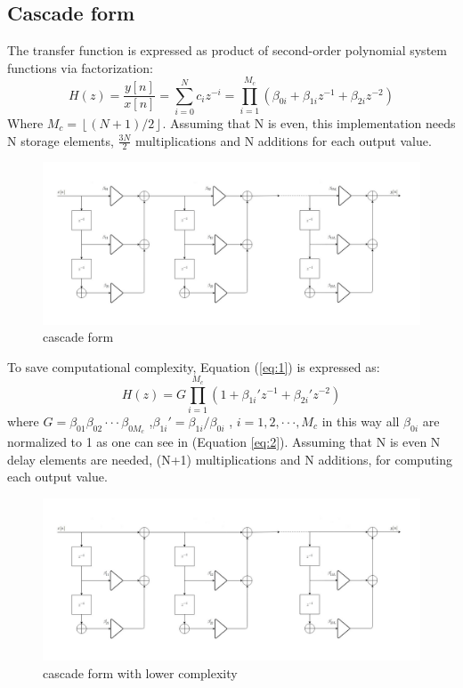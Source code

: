 \subsection{Cascade form}
The transfer function is expressed as product of second-order polynomial system functions via factorization:
\begin{equation} \label{eq:1}
H(z)=\frac{y[n]}{x[n]} =\sum_{i=0}^{N}c_{i}z^{-i}= \prod_{i=1}^{M_{c}}(\beta_{0i}+\beta_{1i}z^{-1}+\beta_{2i}z^{-2})
\end{equation}
Where $M_{c}= \left \lfloor (N+1)/2 \right \rfloor$.
Assuming that N is even, this implementation needs N storage elements, $\frac{3N}{2}$ multiplications and N additions for each output value.
\begin{figure}[H]
    \centering
    \includegraphics[scale=0.35]{images/cascade.jpg}    
    \caption{cascade form}
    \label{fig:cascade}
\end{figure}
To save computational complexity, Equation (\ref{eq:1}) is expressed as:
\begin{equation} \label{eq:2}
H(z)= G\prod_{i=1}^{M_{c}}(1+\beta_{1i}'z^{-1}+\beta_{2i}'z^{-2})
\end{equation}
where $G=\beta_{01}\beta_{02} \cdot\cdot\cdot\beta_{0M_{c}}$ ,$\beta_{1i}'=\beta_{1i}/\beta_{0i}$ , $i= 1,2,\cdot \cdot \cdot,M_{c}$ in this way all $\beta_{0i}$ are normalized to 1 as one can see in (Equation \ref{eq:2}). Assuming that N is even N delay elements are needed, (N+1) multiplications and N additions, for computing each output value.
\begin{figure}[H]
    \centering
    \includegraphics[scale=0.35]{images/cascadeoptimised.jpg}    
    \caption{cascade form with lower complexity}
    \label{fig:cascade_opt}
\end{figure}
